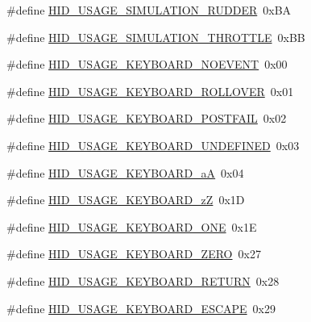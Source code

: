 \begin{DoxyCompactItemize}
\item 
\#define \hyperlink{group__USBD__HID_gab530d25dfff496c8f0ad9326f831ee44}{H\+I\+D\+\_\+\+U\+S\+A\+G\+E\+\_\+\+S\+I\+M\+U\+L\+A\+T\+I\+O\+N\+\_\+\+R\+U\+D\+D\+ER}~0x\+BA
\item 
\#define \hyperlink{group__USBD__HID_ga65a1aadacf2b4f12a61f457786bdaf1c}{H\+I\+D\+\_\+\+U\+S\+A\+G\+E\+\_\+\+S\+I\+M\+U\+L\+A\+T\+I\+O\+N\+\_\+\+T\+H\+R\+O\+T\+T\+LE}~0x\+BB
\end{DoxyCompactItemize}
\begin{DoxyCompactItemize}
\item 
\#define \hyperlink{group__USBD__HID_ga85b93a68c76952d39c3bc1daf17df5e7}{H\+I\+D\+\_\+\+U\+S\+A\+G\+E\+\_\+\+K\+E\+Y\+B\+O\+A\+R\+D\+\_\+\+N\+O\+E\+V\+E\+NT}~0x00
\item 
\#define \hyperlink{group__USBD__HID_gaccadefb2a21b8bf36b8dd1157cbdd09d}{H\+I\+D\+\_\+\+U\+S\+A\+G\+E\+\_\+\+K\+E\+Y\+B\+O\+A\+R\+D\+\_\+\+R\+O\+L\+L\+O\+V\+ER}~0x01
\item 
\#define \hyperlink{group__USBD__HID_ga279f656907c776cd36e1e199dcd4d00b}{H\+I\+D\+\_\+\+U\+S\+A\+G\+E\+\_\+\+K\+E\+Y\+B\+O\+A\+R\+D\+\_\+\+P\+O\+S\+T\+F\+A\+IL}~0x02
\item 
\#define \hyperlink{group__USBD__HID_gabdf4fffe05a95c305c098c701147082e}{H\+I\+D\+\_\+\+U\+S\+A\+G\+E\+\_\+\+K\+E\+Y\+B\+O\+A\+R\+D\+\_\+\+U\+N\+D\+E\+F\+I\+N\+ED}~0x03
\item 
\#define \hyperlink{group__USBD__HID_ga59f598363095effd3b6a9ece083ff78b}{H\+I\+D\+\_\+\+U\+S\+A\+G\+E\+\_\+\+K\+E\+Y\+B\+O\+A\+R\+D\+\_\+aA}~0x04
\item 
\#define \hyperlink{group__USBD__HID_ga98210a9fe6de0fe8af43db6a46559139}{H\+I\+D\+\_\+\+U\+S\+A\+G\+E\+\_\+\+K\+E\+Y\+B\+O\+A\+R\+D\+\_\+zZ}~0x1D
\item 
\#define \hyperlink{group__USBD__HID_ga8170c3b8a8c895fc203a185eaa1bdccb}{H\+I\+D\+\_\+\+U\+S\+A\+G\+E\+\_\+\+K\+E\+Y\+B\+O\+A\+R\+D\+\_\+\+O\+NE}~0x1E
\item 
\#define \hyperlink{group__USBD__HID_gad1bf5d7345921ff532e8aac27826fcb8}{H\+I\+D\+\_\+\+U\+S\+A\+G\+E\+\_\+\+K\+E\+Y\+B\+O\+A\+R\+D\+\_\+\+Z\+E\+RO}~0x27
\item 
\#define \hyperlink{group__USBD__HID_ga0a7a3c7ac4e69addd8eda1da31574a09}{H\+I\+D\+\_\+\+U\+S\+A\+G\+E\+\_\+\+K\+E\+Y\+B\+O\+A\+R\+D\+\_\+\+R\+E\+T\+U\+RN}~0x28
\item 
\#define \hyperlink{group__USBD__HID_gab523b015e0060fca13b8f100630a6e6a}{H\+I\+D\+\_\+\+U\+S\+A\+G\+E\+\_\+\+K\+E\+Y\+B\+O\+A\+R\+D\+\_\+\+E\+S\+C\+A\+PE}~0x29

\end{DoxyCompactItemize}
